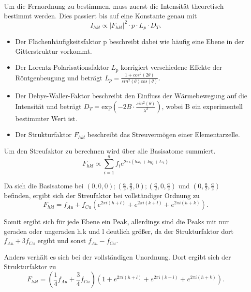 \documentclass[
	a4paper,
	12pt,
	pagesize,
	ngerman
]{scrartcl}
\begin{document}
Um die Fernordnung zu bestimmen, muss zuerst die Intensität theoretisch bestimmt werden. 
Dies passiert bis auf eine Konstante genau mit
\begin{equation}
I_{hkl} \propto |F_{hkl}|^{2} \cdot p \cdot L_{p} \cdot D_{T}.
\end{equation}

\begin{itemize}


\item Der Flächenhäufigkeitsfaktor p beschreibt dabei wie häufig eine Ebene in der Gitterstruktur vorkommt.

\item Der Lorentz-Polarisationsfaktor $L_{p}$ korrigiert verschiedene Effekte der Röntgenbeugung und beträgt $L_{p} =\frac{1 + cos^{2}(2 \theta)}{sin^{2}(\theta) cos(\theta)}$. 

\item Der Debye-Waller-Faktor beschreibt den Einfluss der Wärmebewegung auf die Intensität und beträgt $D_{T} = \text{exp}(-2B \cdot \frac{sin^{2}(\theta)}{\lambda^{2}})$, wobei B ein experimentell bestimmter Wert ist.

\item Der Strukturfaktor $F_{hkl}$ beschreibt das Streuvermögen einer Elementarzelle.
\end{itemize}

Um den Streufaktor zu berechnen wird über alle Basisatome summiert.
\begin{equation}
F_{hkl} \propto \sum_{i=1}^{n} f_{i} e^{2 \pi i(hx_{i} + ky_{i} + lz_{i})}
\end{equation}

Da sich die Basisatome bei $(0,0,0) ; (\frac{a}{2},\frac{a}{2},0) ; (\frac{a}{2},0,\frac{a}{2})$ und $(0, \frac{a}{2}, \frac{a}{2})$ befinden, ergibt sich der Streufaktor bei vollständiger Ordnung zu 
\begin{equation}
F_{hkl} = f_{Au} + f_{Cu} (e^{2 \pi i(h+l)} + e^{2 \pi i(k+l)} + e^{2 \pi i(h+k)}).
\end{equation}

Somit ergibt sich für jede Ebene ein Peak, allerdings sind die Peaks mit nur geraden oder ungeraden h,k und l deutlich größer, da der Strukturfaktor dort $f_{Au} + 3f_{Cu}$ ergibt und sonst $f_{Au} - f_{Cu}$.

Anders verhält es sich bei der vollständigen Unordnung. Dort ergibt sich der Strukturfaktor zu 
\begin{equation}
F_{hkl} = (\frac{1}{4} f_{Au} + \frac{3}{4}f_{Cu}) (1 + e^{2 \pi i(h+l)} + e^{2 \pi i(k+l)} + e^{2 \pi i(h+k)}).
\end{equation}
\end{document}

